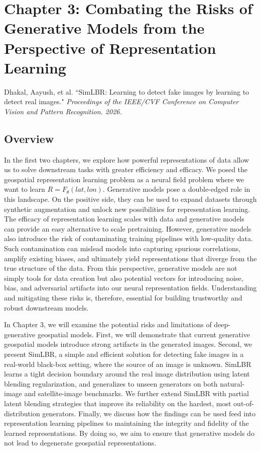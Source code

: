\section{Chapter 3: Combating the Risks of Generative Models from the Perspective of Representation Learning}
Dhakal, Aayush, et al. ``SimLBR: Learning to detect fake images by learning to detect real images." \textit{Proceedings of the IEEE/CVF Conference on Computer Vision and Pattern Recognition. 2026.}
\subsection{Overview}
In the first two chapters, we explore how powerful representations of data allow us to solve downstream tasks with greater efficiency and efficacy. We posed the geospatial representation learning problem as a neural field problem where we want to learn $R=F_\theta(lat, lon)$. Generative models pose a double-edged role in this landscape. On the positive side, they can be used to expand datasets through synthetic augmentation and unlock new possibilities for representation learning. The efficacy of representation learning scales with data and generative models can provide an easy alternative to scale pretraining. However, generative models also introduce the risk of contaminating training pipelines with low-quality data. Such contamination can mislead models into capturing spurious correlations, amplify existing biases, and ultimately yield representations that diverge from the true structure of the data. From this perspective, generative models are not simply tools for data creation but also potential vectors for introducing noise, bias, and adversarial artifacts into our neural representation fields. Understanding and mitigating these risks is, therefore, essential for building trustworthy and robust downstream models.

In Chapter 3, we will examine the potential risks and limitations of deep-generative geospatial models. First, we will demonstrate that current generative geospatial models introduce strong artifacts in the generated images. Second, we present SimLBR, a simple and efficient solution for detecting fake images in a real-world black-box setting, where the source of an image is unknown. SimLBR learns a tight decision boundary around the real image distribution using latent blending regularization, and generalizes to unseen generators on both natural-image and satellite-image benchmarks. We further extend SimLBR with partial latent blending strategies that improve its reliability on the hardest, most out-of-distribution generators. Finally, we discuss how the findings can be used feed into representation learning pipelines to maintaining the integrity and fidelity of the learned representations. By doing so, we aim to ensure that generative models do not lead to degenerate geospatial representations.

